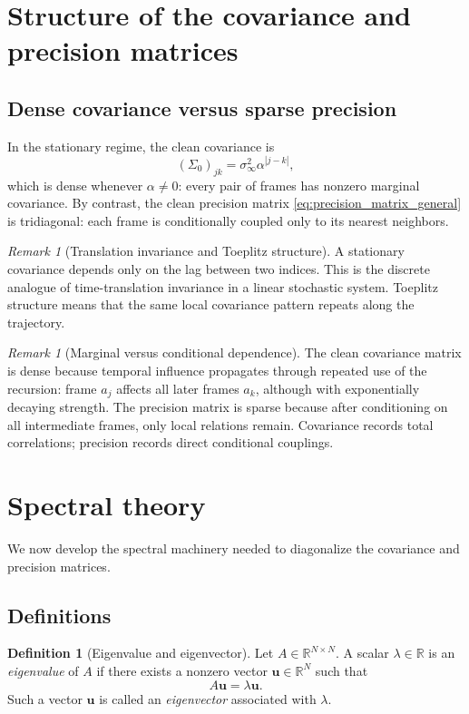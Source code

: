 \documentclass[11pt]{article}
\numberwithin{equation}{section}
\theoremstyle{definition}
\newtheorem{definition}[theorem]{Definition}
\theoremstyle{remark}
\newtheorem{remark}[theorem]{Remark}
\newcommand{\R}{\mathbb{R}}
\begin{document}
\section{Structure of the covariance and precision matrices}\label{sec:matrices}

\subsection{Dense covariance versus sparse precision}

In the stationary regime, the clean covariance is
\[
(\Sigma_0)_{jk}=\sigma_\infty^2\alpha^{|j-k|},
\]
which is dense whenever $\alpha\neq 0$: every pair of frames has nonzero marginal covariance. By contrast, the clean precision matrix \eqref{eq:precision_matrix_general} is tridiagonal: each frame is conditionally coupled only to its nearest neighbors.

\begin{remark}[Translation invariance and Toeplitz structure]
A stationary covariance depends only on the lag between two indices. This is the discrete analogue of time-translation invariance in a linear stochastic system. Toeplitz structure means that the same local covariance pattern repeats along the trajectory.
\end{remark}

\begin{remark}[Marginal versus conditional dependence]
The clean covariance matrix is dense because temporal influence propagates through repeated use of the recursion: frame $a_j$ affects all later frames $a_k$, although with exponentially decaying strength. The precision matrix is sparse because after conditioning on all intermediate frames, only local relations remain. Covariance records total correlations; precision records direct conditional couplings.
\end{remark}

\section{Spectral theory}\label{sec:spectral}

We now develop the spectral machinery needed to diagonalize the covariance and precision matrices.

\subsection{Definitions}

\begin{definition}[Eigenvalue and eigenvector]
Let $A\in\R^{N\times N}$. A scalar $\lambda\in\R$ is an \emph{eigenvalue} of $A$ if there exists a nonzero vector $\mathbf u\in\R^N$ such that
\[
A\mathbf u=\lambda\mathbf u.
\]
Such a vector $\mathbf u$ is called an \emph{eigenvector} associated with $\lambda$.
\end{definition}
\end{document}
